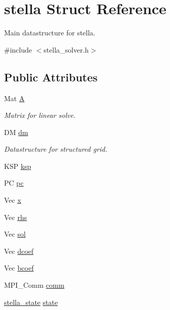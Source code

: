 \hypertarget{structstella}{}\section{stella Struct Reference}
\label{structstella}


Main datastructure for stella.  




{\ttfamily \#include $<$stella\+\_\+solver.\+h$>$}

\subsection*{Public Attributes}
\begin{DoxyCompactItemize}
\item 
Mat \mbox{\hyperlink{structstella_a09d8cdb7d92810c812f7d698a0f1a4b4}{A}}
\begin{DoxyCompactList}\small\item\em Matrix for linear solve. \end{DoxyCompactList}\item 
DM \mbox{\hyperlink{structstella_ac724e6b2d361304142c67ce93ff57501}{dm}}
\begin{DoxyCompactList}\small\item\em Datastructure for structured grid. \end{DoxyCompactList}\item 
K\+SP \mbox{\hyperlink{structstella_a18c7afda86d38f4cb8fe7eb32daf1325}{ksp}}
\item 
PC \mbox{\hyperlink{structstella_a0f8ea4b1a1bab930af2569bfdcc0bf4c}{pc}}
\item 
Vec \mbox{\hyperlink{structstella_a750f469d7d2f9ffaec59387b0f96f268}{x}}
\item 
Vec \mbox{\hyperlink{structstella_a5fba06f51a3081fbb1873a43e556e4ad}{rhs}}
\item 
Vec \mbox{\hyperlink{structstella_a58a97ffe5282902bff30e2ff96b9dddd}{sol}}
\item 
Vec \mbox{\hyperlink{structstella_ac54141fea0cae02df9eeb6d79e30ab01}{dcoef}}
\item 
Vec \mbox{\hyperlink{structstella_ad4c46753eded86dd2619f152f9fe45dc}{bcoef}}
\item 
M\+P\+I\+\_\+\+Comm \mbox{\hyperlink{structstella_a7e306c61cf9216d0efb54ad077c60e0d}{comm}}
\item 
\mbox{\hyperlink{structstella__state}{stella\+\_\+state}} \mbox{\hyperlink{structstella_aac56c924df3628157325df5abaece198}{state}}

\end{DoxyCompactItemize}
